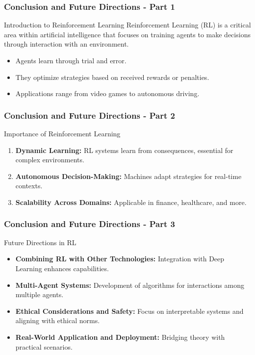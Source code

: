 \documentclass{beamer}
\begin{document}
\begin{frame}[fragile]
    \frametitle{Conclusion and Future Directions - Part 1}
    \begin{block}{Introduction to Reinforcement Learning}
        Reinforcement Learning (RL) is a critical area within artificial intelligence that focuses on training agents to make decisions through interaction with an environment.
        \begin{itemize}
            \item Agents learn through trial and error.
            \item They optimize strategies based on received rewards or penalties.
            \item Applications range from video games to autonomous driving.
        \end{itemize}
    \end{block}
\end{frame}

\begin{frame}[fragile]
    \frametitle{Conclusion and Future Directions - Part 2}
    \begin{block}{Importance of Reinforcement Learning}
        \begin{enumerate}
            \item \textbf{Dynamic Learning:} RL systems learn from consequences, essential for complex environments.
            \item \textbf{Autonomous Decision-Making:} Machines adapt strategies for real-time contexts.
            \item \textbf{Scalability Across Domains:} Applicable in finance, healthcare, and more.
        \end{enumerate}
    \end{block}
\end{frame}

\begin{frame}[fragile]
    \frametitle{Conclusion and Future Directions - Part 3}
    \begin{block}{Future Directions in RL}
        \begin{itemize}
            \item \textbf{Combining RL with Other Technologies:} Integration with Deep Learning enhances capabilities.
            \item \textbf{Multi-Agent Systems:} Development of algorithms for interactions among multiple agents.
            \item \textbf{Ethical Considerations and Safety:} Focus on interpretable systems and aligning with ethical norms.
            \item \textbf{Real-World Application and Deployment:} Bridging theory with practical scenarios.
        \end{itemize}
    \end{block}
\end{frame}
\end{document}
